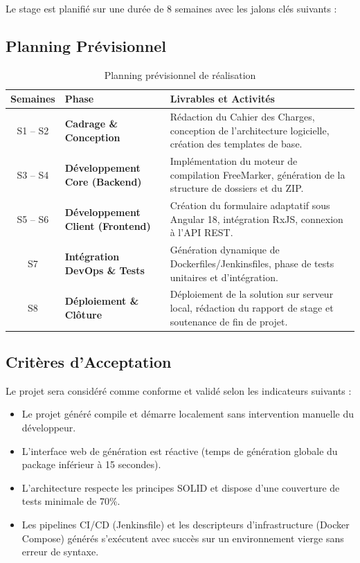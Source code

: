 \documentclass[12pt,a4paper]{article}
\begin{document}
Le stage est planifié sur une durée de 8 semaines avec les jalons clés suivants :

\subsection{Planning Prévisionnel}
\begin{table}[H]
\centering
\small
\renewcommand{\arraystretch}{1.3}
\begin{tabularx}{\textwidth}{c >{\bfseries\color{primary}}l X}
\toprule
\textbf{Semaines} & \textbf{Phase} & \textbf{Livrables et Activités} \\
\midrule
S1 -- S2 & Cadrage \& Conception & Rédaction du Cahier des Charges, conception de l'architecture logicielle, création des templates de base. \\
S3 -- S4 & Développement Core (Backend) & Implémentation du moteur de compilation FreeMarker, génération de la structure de dossiers et du ZIP. \\
S5 -- S6 & Développement Client (Frontend) & Création du formulaire adaptatif sous Angular 18, intégration RxJS, connexion à l'API REST. \\
S7 & Intégration DevOps \& Tests & Génération dynamique de Dockerfiles/Jenkinsfiles, phase de tests unitaires et d'intégration. \\
S8 & Déploiement \& Clôture & Déploiement de la solution sur serveur local, rédaction du rapport de stage et soutenance de fin de projet. \\
\bottomrule
\end{tabularx}
\caption{Planning prévisionnel de réalisation}
\end{table}

\subsection{Critères d'Acceptation}
Le projet sera considéré comme conforme et validé selon les indicateurs suivants :
\begin{itemize}[label=\textcolor{primary}{\checkmark}]
    \item Le projet généré compile et démarre localement sans intervention manuelle du développeur.
    \item L'interface web de génération est réactive (temps de génération globale du package inférieur à 15 secondes).
    \item L'architecture respecte les principes SOLID et dispose d'une couverture de tests minimale de 70\%.
    \item Les pipelines CI/CD (Jenkinsfile) et les descripteurs d'infrastructure (Docker Compose) générés s'exécutent avec succès sur un environnement vierge sans erreur de syntaxe.
\end{itemize}
\end{document}
